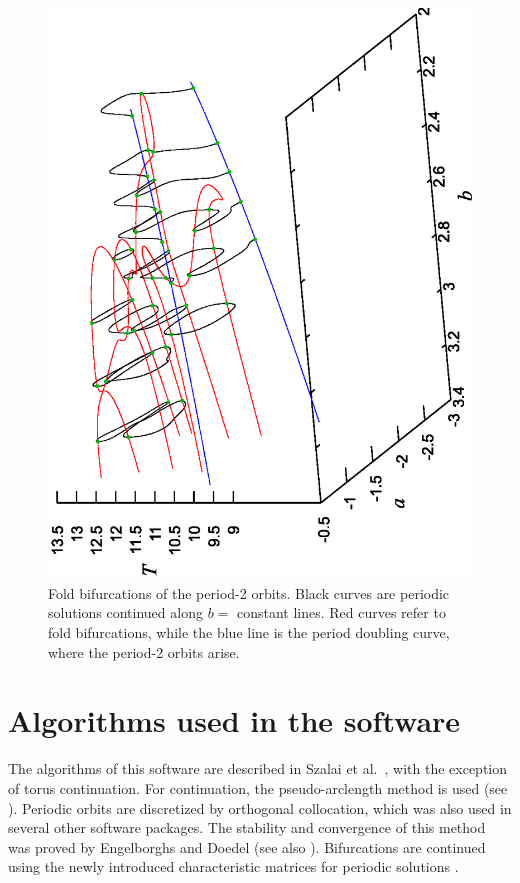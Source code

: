 \documentclass[10pt,a4paper]{ddedoc}
\begin{document}
\begin{figure}
\begin{center}
\includegraphics[scale=0.6,angle=270]{fig/fold3d-2.eps}
\end{center}
\caption{Fold bifurcations of the period-2 orbits. Black curves are periodic solutions continued along $b=$ constant lines. Red curves refer to fold bifurcations, while the blue line is the period doubling curve, where the period-2 orbits arise. }
\label{pdfold}
\end{figure}

\section{Algorithms used in the software}

The algorithms of this software are described in Szalai et al.\ \cite{szalai-cont}, with the exception of torus continuation. For continuation, the pseudo-arclength method is used (see \cite{handbook, tutorial1, tutorial2}). Periodic orbits are discretized by orthogonal collocation, which was also used in several other software packages. The stability and convergence of this method was proved by Engelborghs and Doedel \cite{engstab} (see also \cite{engcol}). Bifurcations are continued using the newly introduced characteristic matrices for periodic solutions \cite{szalai-cont}.
\end{document}
